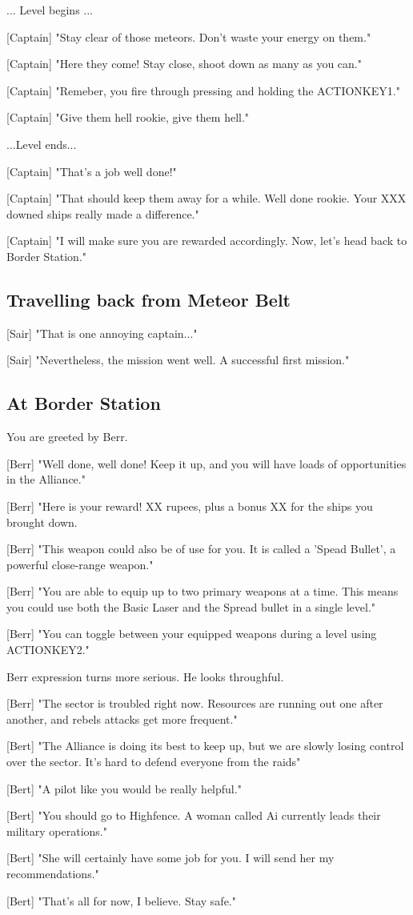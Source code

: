 \documentclass[a4paper,12pt]{article}
\begin{document}
... Level begins ...

[Captain] "Stay clear of those meteors. Don't waste your energy on them."

[Captain] "Here they come! Stay close, shoot down as many as you can." 

[Captain] "Remeber, you fire through pressing and holding the ACTIONKEY1." 

[Captain] "Give them hell rookie, give them hell."

...Level ends...

[Captain] "That's a job well done!" 

[Captain] "That should keep them away for a while. Well done rookie. Your XXX downed ships really made a difference."

[Captain] "I will make sure you are rewarded accordingly. Now, let's head back to Border Station."

\subsection{Travelling back from Meteor Belt}

[Sair] "That is one annoying captain..." 

[Sair] "Nevertheless, the mission went well. A successful first mission."

\subsection{At Border Station}

You are greeted by Berr. 

[Berr] "Well done, well done! Keep it up, and you will have loads of opportunities
in the Alliance." 

[Berr] "Here is your reward! XX rupees, plus a bonus XX for the ships you brought down. 

[Berr] "This weapon could also be of use for you. It is called a 'Spead Bullet', a powerful close-range weapon."

[Berr] "You are able to equip up to two primary weapons at a time. This means you could use both the Basic Laser and 
the Spread bullet in a single level."

[Berr] "You can toggle between your equipped weapons during a level using ACTIONKEY2."

Berr expression turns more serious. He looks throughful.

[Berr] "The sector is troubled right now. Resources are running out one after another,
and rebels attacks get more frequent."

[Bert] "The Alliance is doing its best to keep up, but we are slowly losing control over the sector. It's hard to defend
everyone from the raids"

[Bert] "A pilot like you would be really helpful."

[Bert] "You should go to Highfence. A woman called Ai currently leads their military operations."

[Bert] "She will certainly have some job for you. I will send her my recommendations."

[Bert] "That's all for now, I believe. Stay safe."
\end{document}
